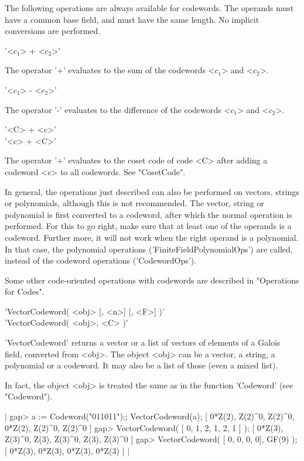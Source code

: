 
The following operations are always available for codewords. The operands
must have a common base field, and must have the same length. No implicit
conversions are performed.

'<$c_1$> + <$c_2$>'

The operator  '+'  evaluates  to the   sum of the  codewords <$c_1$>  and
<$c_2$>.

'<$c_1$> - <$c_2$>'

The operator '-' evaluates to the difference of the codewords <$c_1$> and
<$c_2$>.

'<C> + <c>'\\
'<c> + <C>'

The operator '+' evaluates to the  coset code of  code <C> after adding a
codeword <c> to all codewords. See "CosetCode".

In general, the    operations just described  can also    be performed on
vectors,  strings or polynomials,  although this is  not recommended. The
vector, string  or  polynomial is  first converted  to  a codeword, after
which the normal operation is performed. For this to  go right, make sure
that at  least one of  the operands is a  codeword. Further more, it will
not  work when  the  right operand  is  a  polynomial. In that  case, the
polynomial operations ('FiniteFieldPolynomialOps') are called, instead of
the codeword operations ('CodewordOps').

Some other   code-oriented  operations with  codewords are   described in
"Operations for Codes".


'VectorCodeword( <obj> [, <n>] [, <F>] )'\\
'VectorCodeword( <obj>, <C> )'

'VectorCodeword' returns a  vector or a list  of vectors of elements of a
Galois field, converted from  <obj>. The object <obj>  can be a vector, a
string, a polynomial or a codeword. It may also be a  list of those (even
a mixed list).

In   fact,  the object <obj>   is  treated the  same  as  in the function
'Codeword' (see "Codeword").

|    gap> a := Codeword("011011");; VectorCodeword(a);
    [ 0*Z(2), Z(2)^0, Z(2)^0, 0*Z(2), Z(2)^0, Z(2)^0 ]
    gap> VectorCodeword( [ 0, 1, 2, 1, 2, 1 ] );
    [ 0*Z(3), Z(3)^0, Z(3), Z(3)^0, Z(3), Z(3)^0 ]
    gap> VectorCodeword( [ 0, 0, 0, 0], GF(9) );
    [ 0*Z(3), 0*Z(3), 0*Z(3), 0*Z(3) ] |

